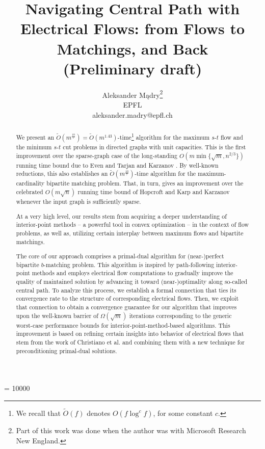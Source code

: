\documentclass[11pt, letterpaper]{article}
\newcommand{\tO}[1]{\widetilde{O}(#1)}
\newcommand{\bb}{\boldsymbol{\mathit{b}}}
\begin{document}
\widowpenalty = 10000



\title{Navigating Central Path with Electrical Flows: from Flows to Matchings, and Back \\{\bf (Preliminary draft)}}

\author{Aleksander M\k{a}dry\thanks{Part of this work was done when the author was with Microsoft Research New England.}\\
       {EPFL}\\
       { aleksander.madry@epfl.ch}}
\date{}

\maketitle
\begin{abstract}

We present an $\tO{m^{\frac{10}{7}}}=\tO{m^{1.43}}$-time\footnote{We recall that $\tO{f}$ denotes $O(f \log^c f)$, for some constant $c$.} algorithm for the maximum $s$-$t$ flow and the minimum $s$-$t$ cut problems in directed graphs with unit capacities. This is the first improvement over the sparse-graph case of the long-standing $O(m\min\{\sqrt{m},n^{2/3}\})$ running time bound due to Even and Tarjan \cite{EvenT75} and Karzanov \cite{Karzanov73}. By well-known reductions, this also establishes an $\tO{m^{\frac{10}{7}}}$-time algorithm for the maximum-cardinality bipartite matching problem. That, in turn, gives an improvement over the celebrated $O(m\sqrt{n})$ running time bound of Hopcroft and Karp \cite{HopcroftK73} and Karzanov \cite{Karzanov73} whenever the input graph is sufficiently sparse. 

At a very high level, our results stem from acquiring a deeper understanding of interior-point methods -- a powerful tool in convex optimization -- in the context of flow problems, as well as, utilizing certain interplay between maximum flows and bipartite matchings.

The core of our approach comprises a primal-dual algorithm for {(near-)}perfect bipartite $\bb$-matching problem. This algorithm is inspired by path-following interior-point methods and employs electrical flow computations to gradually improve the quality of maintained solution by advancing it toward (near-)optimality along so-called central path. To analyze this process, we establish a formal connection that ties its convergence rate to the structure of corresponding electrical flows. Then, we exploit that connection to obtain a convergence guarantee for our algorithm that improves upon the well-known barrier of $\Omega(\sqrt{m})$ iterations corresponding to the generic worst-case performance bounds for interior-point-method-based algorithms. This improvement is based on refining certain insights into behavior of electrical flows that stem from the work of Christiano et al. \cite{ChristianoKMST11} and combining them with a new technique for preconditioning primal-dual solutions.


\end{abstract}
\end{document}
